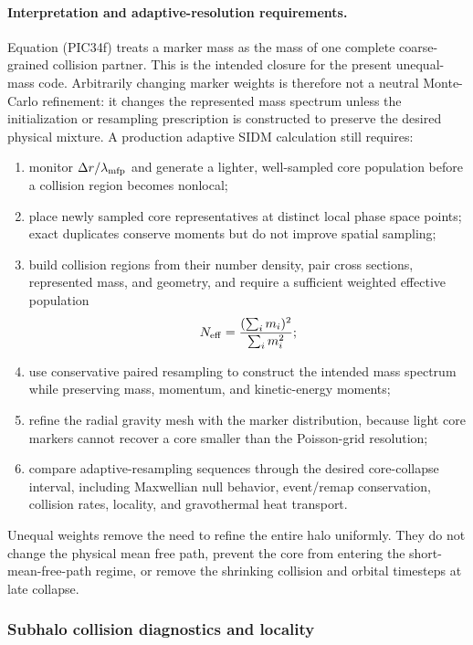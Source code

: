 \paragraph{Interpretation and adaptive-resolution requirements.}
Equation (PIC34f) treats a marker mass as the mass of one complete
coarse-grained collision partner.  This is the intended closure for the
present unequal-mass code.  Arbitrarily changing marker weights is therefore
not a neutral Monte-Carlo refinement: it changes the represented mass
spectrum unless the initialization or resampling prescription is constructed
to preserve the desired physical mixture.  A production adaptive SIDM
calculation still requires:
\begin{enumerate}
\item monitor \(\Delta r/\lambda_{\rm mfp}\) and generate a lighter,
      well-sampled core population before a collision region becomes nonlocal;
\item place newly sampled core representatives at distinct local phase space
      points; exact duplicates conserve moments but do not improve spatial
      sampling;
\item build collision regions from their number density, pair cross sections,
      represented mass, and geometry, and
      require a sufficient weighted effective population
      \[
       N_{\rm eff}=
       \frac{(\sum_i m_i)^2}{\sum_i m_i^2};
      \]
\item use conservative paired resampling to construct the intended mass
      spectrum while preserving mass, momentum, and kinetic-energy moments;
\item refine the radial gravity mesh with the marker distribution, because
      light core markers cannot recover a core smaller than the Poisson-grid
      resolution;
\item compare adaptive-resampling sequences through the desired core-collapse
      interval, including Maxwellian null behavior, event/remap conservation,
      collision rates, locality, and gravothermal heat transport.
\end{enumerate}
Unequal weights remove the need to refine the entire halo uniformly.  They do
not change the physical mean free path, prevent the core from entering the
short-mean-free-path regime, or remove the shrinking collision and orbital
timesteps at late collapse.

\subsubsection{Subhalo collision diagnostics and locality}

